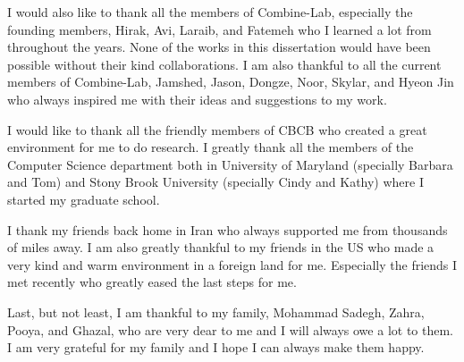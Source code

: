 I would also like to thank all the members of Combine-Lab, especially the founding members, Hirak, Avi, Laraib, and Fatemeh who I learned a lot from throughout the years. None of the works in this dissertation would have been possible without their kind collaborations. I am also thankful to all the current members of Combine-Lab, Jamshed, Jason, Dongze, Noor, Skylar, and Hyeon Jin who always inspired me with their ideas and suggestions to my work.

I would like to thank all the friendly members of CBCB who created a great environment for me to do research. I greatly thank all the members of the Computer Science department both in University of Maryland (specially Barbara and Tom) and  Stony Brook University (specially Cindy and Kathy) where I started my graduate school.

I thank my friends back home in Iran who always supported me from thousands of miles away. I am also greatly  thankful to my friends in the US who made a very kind and warm environment in a foreign land for me.
Especially the friends I met recently who greatly eased the last steps for me.

Last, but not least, I am thankful to my family, Mohammad Sadegh, Zahra, Pooya, and Ghazal, who are very dear to me and I will always owe a lot to them. I am very grateful for my family and I hope I can always make them happy.